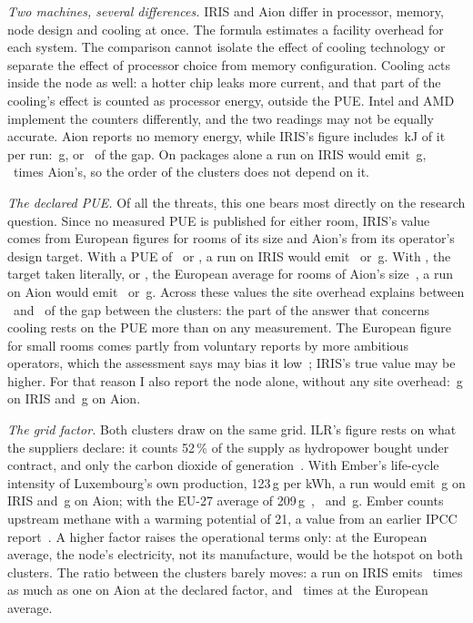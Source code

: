 \documentclass[conference,a4paper]{IEEEtran}
\begin{document}
\emph{Two machines, several differences.} IRIS and Aion differ in processor,
memory, node design and cooling at once. The formula estimates a facility
overhead for each system. The comparison cannot isolate the effect of cooling
technology or separate the effect of processor choice from memory configuration. Cooling
acts inside the node as well: a hotter chip leaks more current, and that part of
the cooling's effect is counted as processor energy, outside the PUE. Intel and
AMD implement the counters differently, and the two readings may not be equally
accurate. Aion reports no memory energy, while IRIS's figure includes
\IrisDram\,kJ of it per run: \IrisMemGrams\,g, or \IrisMemGapShare\ of the gap.
On packages alone a run on IRIS would emit \IrisGramsPkgOnly\,g,
\GapRatioPkgOnly\ times Aion's, so the order of the clusters does not depend on
it.

\emph{The declared PUE.} Of all the threats, this one bears most directly on the
research question. Since no measured PUE is published for either room, IRIS's
value comes from European figures for rooms of its size and Aion's from its
operator's design target. With a PUE of \IrisPueLow\ or \IrisPueHigh, a run on
IRIS would emit \IrisGramsPueLow\ or \IrisGramsPueHigh\,g. With \AionPueLow, the
target taken literally, or \AionPueHigh, the European average for rooms of Aion's
size~\cite{ec2025}, a run on Aion would emit \AionGramsPueLow\ or
\AionGramsPueHigh\,g. Across these values the site overhead explains between
\GapShareSiteMin\ and \GapShareSiteMax\ of the gap between the clusters: the
part of the answer that concerns cooling rests on the PUE more than on any
measurement. The
European figure for small rooms comes partly from voluntary reports by more
ambitious operators, which the assessment says may bias it low~\cite{ec2025};
IRIS's true value may be higher. For that reason I also
report the node alone, without any site overhead: \IrisGramsNoSite\,g on IRIS
and \AionGramsNoSite\,g on Aion.

\emph{The grid factor.} Both clusters draw on the same grid. ILR's figure rests on
what the suppliers declare: it counts 52\,\% of the supply as hydropower bought
under contract, and only the carbon dioxide of generation~\cite{ilr2026}. With
Ember's life-cycle intensity of Luxembourg's own production, 123\,g per kWh, a
run would emit \IrisGramsEmber\,g on IRIS and \AionGramsEmber\,g on Aion; with
the EU-27 average of 209\,g~\cite{ries2026s2}, \IrisGramsEU\ and
\AionGramsEU\,g. Ember counts upstream methane with a warming potential of 21, a
value from an earlier IPCC report~\cite{ries2026s2}. A higher factor raises the operational terms only: at the
European average, the node's electricity, not its manufacture, would be the
hotspot on both clusters. The ratio between the clusters barely moves: a run on
IRIS emits \GapRatio\ times as much as one on Aion at the declared factor, and
\GapRatioEU\ times at the European average.
\end{document}
